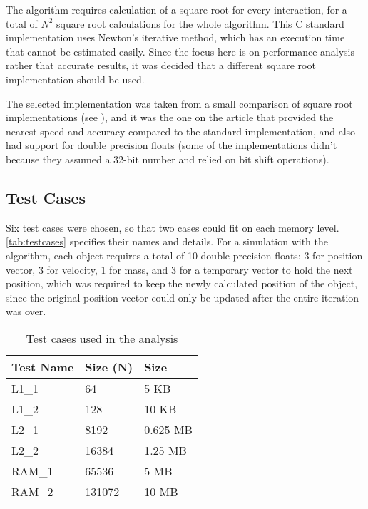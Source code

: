 \documentclass[twocolumn,10pt]{scrartcl}
\begin{document}
The algorithm requires  calculation of a square root for every interaction, for a total of $N^{2}$ square root calculations for the whole algorithm. This C standard implementation uses Newton's iterative method, which has an execution time that cannot be estimated easily. Since the focus here is on performance analysis rather that accurate results, it was decided that a different square root implementation should be used.

The selected implementation was taken from a small comparison of square root implementations (see \cite{sqrt}), and it was the one on the article that provided the nearest speed and accuracy compared to the standard implementation, and also had support for double precision floats (some of the implementations didn't because they assumed a 32-bit number and relied on bit shift operations).


\subsection{Test Cases}

Six test cases were chosen, so that two cases could fit on each memory level. \autoref{tab:testcases} specifies their names and details. For a simulation with the algorithm, each object requires a total of 10 double precision floats: 3 for position vector, 3 for velocity, 1 for mass, and 3 for a temporary vector to hold the next position, which was required to keep the newly calculated position of the object, since the original position vector could only be updated after the entire iteration was over.

\begin{table}[!htp]
	\begin{center}
		\begin{tabular}{|l|l|l|}
			\hline
			\textbf{Test Name}	&	\textbf{Size (N)}	&	\textbf{Size}	\\
			\hline
			L1\_1				&	64					&	5 KB			\\
			L1\_2				&	128					&	10 KB			\\
			L2\_1				&	8192				&	0.625 MB		\\
			L2\_2				&	16384				&	1.25 MB			\\
			RAM\_1				&	65536				&	5 MB			\\
			RAM\_2				&	131072				&	10 MB			\\
			\hline
		\end{tabular}
	\end{center}
	\caption{Test cases used in the analysis \label{tab:testcases}}
\end{table}
\end{document}
